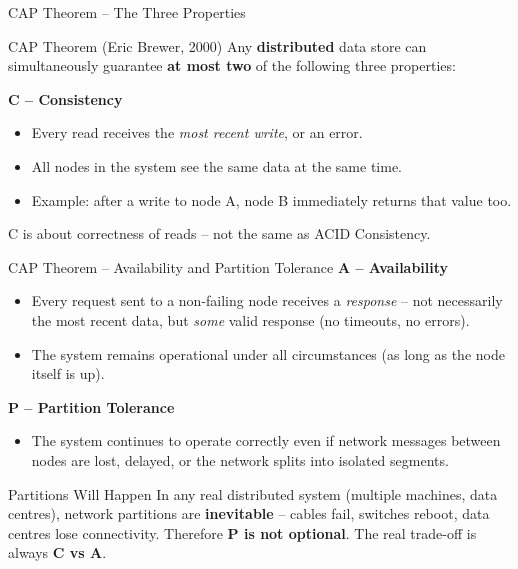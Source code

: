 \begin{frame}{CAP Theorem -- The Three Properties}
  \begin{block}{CAP Theorem (Eric Brewer, 2000)}
    Any \textbf{distributed} data store can simultaneously guarantee \textbf{at most two} of the
    following three properties:
  \end{block}

  \vspace{6pt}
  \textbf{C -- Consistency}
  \begin{itemize}
    \item Every read receives the \emph{most recent write}, or an error.
    \item All nodes in the system see the same data at the same time.
    \item Example: after a write to node A, node B immediately returns that value too.
  \end{itemize}

  \vspace{4pt}
  \begin{block}{C is about correctness of reads -- not the same as ACID Consistency.}
  \end{block}
\end{frame}

\begin{frame}{CAP Theorem -- Availability and Partition Tolerance}
  \textbf{A -- Availability}
  \begin{itemize}
    \item Every request sent to a non-failing node receives a \emph{response} -- not necessarily
          the most recent data, but \emph{some} valid response (no timeouts, no errors).
    \item The system remains operational under all circumstances (as long as the node itself is up).
  \end{itemize}

  \vspace{8pt}
  \textbf{P -- Partition Tolerance}
  \begin{itemize}
    \item The system continues to operate correctly even if network messages between nodes
          are lost, delayed, or the network splits into isolated segments.
  \end{itemize}

  \begin{alertblock}{Partitions Will Happen}
    In any real distributed system (multiple machines, data centres), network partitions are
    \textbf{inevitable} -- cables fail, switches reboot, data centres lose connectivity.
    Therefore \textbf{P is not optional}. The real trade-off is always \textbf{C vs A}.
  \end{alertblock}
\end{frame}

